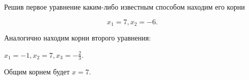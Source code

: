 \solutionSection
Решив первое уравнение каким-либо известным способом находим его корни	

    $$x_1 = 7, x_2 = -6.$$
    
Аналогично находим корни второго уравнения: 

    $x_1 = -1, x_2 = 7, x_3 = -\frac{2}{3}$.
    
Общим корнем будет $x = 7$.

